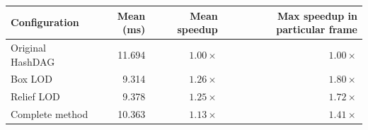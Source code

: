 \begin{tabular}{lrrr}
\toprule
Configuration & Mean (ms) & Mean speedup & Max speedup in particular frame \\
\midrule
Original HashDAG & 11.694 & $1.00\times$ & $1.00\times$ \\
Box LOD & 9.314 & $1.26\times$ & $1.80\times$ \\
Relief LOD & 9.378 & $1.25\times$ & $1.72\times$ \\
Complete method & 10.363 & $1.13\times$ & $1.41\times$ \\
\bottomrule
\end{tabular}
